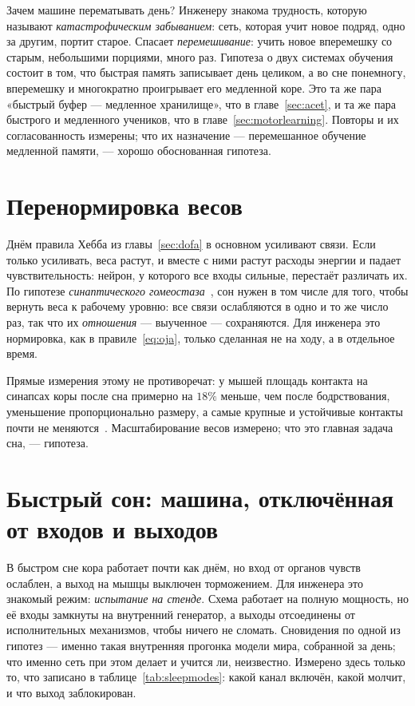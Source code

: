 Зачем машине перематывать день? Инженеру знакома трудность, которую называют \emph{катастрофическим забыванием}: сеть, которая учит новое подряд, одно за другим, портит старое. Спасает \emph{перемешивание}: учить новое вперемешку со старым, небольшими порциями, много раз. Гипотеза о двух системах обучения~\cite{McClelland1995} состоит в том, что быстрая память записывает день целиком, а во сне понемногу, вперемешку и многократно проигрывает его медленной коре. Это та же пара «быстрый буфер --- медленное хранилище», что в главе~\ref{sec:acet}, и та же пара быстрого и медленного учеников, что в главе~\ref{sec:motorlearning}. Повторы и их согласованность измерены; что их назначение --- перемешанное обучение медленной памяти, --- хорошо обоснованная гипотеза.

\section{Перенормировка весов}

Днём правила Хебба из главы~\ref{sec:dofa} в основном усиливают связи. Если только усиливать, веса растут, и вместе с ними растут расходы энергии и падает чувствительность: нейрон, у которого все входы сильные, перестаёт различать их. По гипотезе \emph{синаптического гомеостаза}~\cite{TononiCirelli2014}, сон нужен в том числе для того, чтобы вернуть веса к рабочему уровню: все связи ослабляются в одно и то же число раз, так что их \emph{отношения} --- выученное --- сохраняются. Для инженера это нормировка, как в правиле~\eqref{eq:oja}, только сделанная не на ходу, а в отдельное время.

Прямые измерения этому не противоречат: у мышей площадь контакта на синапсах коры после сна примерно на $18\%$ меньше, чем после бодрствования, уменьшение пропорционально размеру, а самые крупные и устойчивые контакты почти не меняются~\cite{deVivo2017}. Масштабирование весов измерено; что это главная задача сна, --- гипотеза.

\section{Быстрый сон: машина, отключённая от входов и выходов}

В быстром сне кора работает почти как днём, но вход от органов чувств ослаблен, а выход на мышцы выключен торможением. Для инженера это знакомый режим: \emph{испытание на стенде}. Схема работает на полную мощность, но её входы замкнуты на внутренний генератор, а выходы отсоединены от исполнительных механизмов, чтобы ничего не сломать. Сновидения по одной из гипотез --- именно такая внутренняя прогонка модели мира, собранной за день; что именно сеть при этом делает и учится ли, неизвестно. Измерено здесь только то, что записано в таблице~\ref{tab:sleepmodes}: какой канал включён, какой молчит, и что выход заблокирован.

